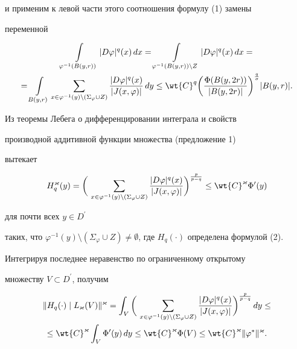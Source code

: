 и применим к левой части этого соотношения формулу (1) замены


переменной


\begin{multline*}


\int\limits_{\varphi^{-1}(B(y,r))} |D\varphi|^q(x)\,dx=


\int\limits_{\varphi^{-1}(B(y,r))\setminus Z}


|D\varphi|^q(x)\,dx =\\


=\int\limits_{B(y,r)}


\sum_{x\in\varphi^{-1}(y)\setminus(\Sigma_{\varphi}\cup Z)}


\frac{|D\varphi|^q(x)}{|J(x,\varphi)|} \,dy \leq


\wt{C}^q\bigg(\frac{\Phi(B(y,2r))}{|B(y,2r)|}


\bigg)^{\frac{q}{\sigma}}|B(y,r)|.


\end{multline*}


Из теоремы Лебега о дифференцировании интеграла и свойств


производной аддитивной функции множества (предложение 1)


вытекает


$$


H^{\varkappa}_q(y)=\bigg(\,\sum_{x\in\varphi^{-1}(y)\setminus


(\Sigma_{\varphi}\cup Z)}


\frac{|D\varphi|^q(x)}{|J(x,\varphi)|}\bigg)^{\frac{p}{p-q}} \le


\wt{C}^{\varkappa}\Phi'(y)


$$


для почти всех $y\in D^{\prime}$


таких, что $\varphi^{-1}(y)\setminus (\Sigma_{\varphi}\cup


Z)\ne\emptyset$, где $H_q(\cdot)$ определена формулой (2).





Интегрируя последнее неравенство по ограниченному открытому


множеству $V\subset D^{\prime}$, получим


\begin{multline*}


\|H_q(\cdot)\mid L_{\varkappa}(V)\|^{\varkappa}=\int_{V}


\bigg(\,\sum_{x\in\varphi^{-1}(y)\setminus


(\Sigma_{\varphi}\cup Z)}


\frac{|D\varphi|^q(x)}{|J(x,\varphi)|}\bigg)^{\frac{p}{p-q}} \,dy\le\\


\le \wt{C}^{\varkappa}\int_{V}\Phi'(y)\,dy \le


\wt{C}^{\varkappa}\Phi(V)\le


\wt{C}^{\varkappa}\|\varphi^{\ast}\|^\varkappa.


\end{multline*}


